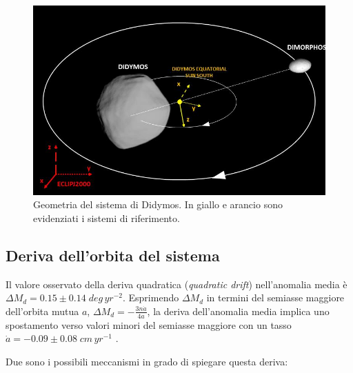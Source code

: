 \documentclass[a4paper,11pt,openright]{book}
\begin{document}
\begin{figure}[!h]
    \centering
    \includegraphics[scale=0.78]{figure/system_orbit.jpg}
    \caption[Geometria del sistema di Didymos.]{Geometria del sistema di Didymos. In giallo e arancio sono evidenziati i sistemi di riferimento. \citep{bottiglieri_applied_2022}}
    \label{fig:system_orbit}
\end{figure}

\subsection{Deriva dell'orbita del sistema}
Il valore osservato della deriva quadratica (\textit{quadratic drift}) nell'anomalia media è $\Delta M_d=0.15\pm 0.14\; deg\,yr^{-2}$. Esprimendo $\Delta M_d$ in termini del semiasse maggiore dell'orbita mutua $a$, $\Delta M_d=-\frac{3n\dot{a}}{4a}$, la deriva dell'anomalia media implica uno spostamento verso valori minori del semiasse maggiore con un tasso \\$\dot{a}=-0.09 \pm 0.08\;cm\,yr^{-1}$ \citep{scheirich_preimpact_2022}. 

Due sono i possibili meccanismi in grado di spiegare questa deriva:
\end{document}
